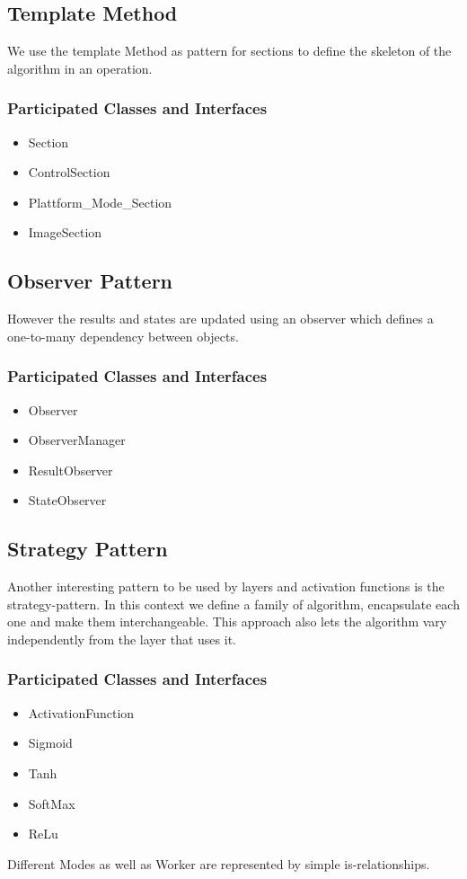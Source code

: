 \documentclass[parskip=full]{scrartcl}
\begin{document}
	\subsection{Template Method}
	We use the template Method as pattern for sections to define the skeleton of the algorithm in an operation.
		\subsubsection{Participated Classes and Interfaces}
		\begin{itemize}
			\item Section
			\item ControlSection
			\item Plattform\_Mode\_Section
			\item ImageSection
		\end{itemize}

	\subsection{Observer Pattern}
	However the results and states are updated using an observer which defines a one-to-many dependency between objects.
			\subsubsection{Participated Classes and Interfaces}
		\begin{itemize}
			\item Observer
			\item ObserverManager
			\item ResultObserver
			\item StateObserver
		\end{itemize}

	\subsection{Strategy Pattern}
	Another interesting pattern to be used by layers and activation functions is the strategy-pattern. In this context we define a family of algorithm, encapsulate each one and make them interchangeable. This approach also lets the algorithm vary independently from the layer that uses it.

	\subsubsection{Participated Classes and Interfaces}
		\begin{itemize}
			\item ActivationFunction
			\item Sigmoid
			\item Tanh
			\item SoftMax
			\item ReLu
		\end{itemize}
Different Modes as well as Worker are represented by simple is-relationships.
\end{document}
